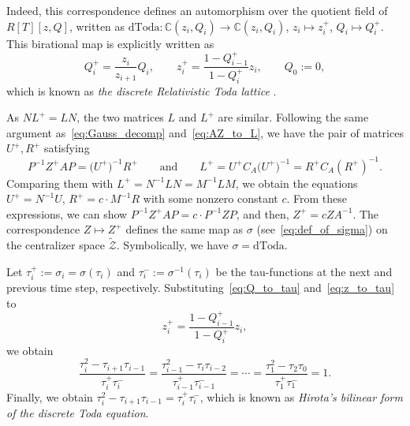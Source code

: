 \documentclass[10pt,a4paper]{amsart}
\numberwithin{equation}{section}
\def\CC{\mathord{\mathbb{C}}}
\theoremstyle{definition}
\begin{document}
Indeed, this correspondence defines an automorphism over the quotient field of~$R[T][z,Q]$, written as
$%
\mathrm{dToda}\colon \CC(z_i,Q_i)\to \CC(z_i,Q_i)$, $ z_i\mapsto z_i^+$, $ Q_i\mapsto Q_i^+$.
This birational map is explicitly written as
\[
Q^+_i=\frac{z_{i}}{z_{i+1}}Q_i, \qquad
z^+_i=\frac{1-Q^+_{i-1}}{1-Q^+_{i}}z_i
, \qquad Q_0:=0,
\]
which is known as \textit{the discrete Relativistic Toda lattice} \cite{Suris}.


As $NL^+=LN$, the two matrices $L$ and $L^+$ are similar.
Following the same argument as~\eqref{eq:Gauss_decomp} and~\eqref{eq:AZ_to_L}, we have the pair of matrices $U^+,R^+$ satisfying
\[
P^{-1}Z^+AP=\bigl(U^+\bigr)^{-1}R^+\qquad \mbox{and} \qquad L^+=U^+C_A\bigl(U^+\bigr)^{-1}=R^+C_A(R^+)^{-1}.
\]
Comparing them with $L^+=N^{-1}LN=M^{-1}LM$, we obtain the equations
$
U^{+}=N^{-1}U$, $ R^+=c \cdot M^{-1}R
$
with some nonzero constant $c$.
From these expressions, we can show $P^{-1}Z^+AP=c\cdot P^{-1}ZP$, and then,
$%
Z^+=cZA^{-1}$.
The correspondence $Z\mapsto Z^+$ defines the same map as $\sigma$ (see~\eqref{eq:def_of_sigma}) on the centralizer space $\tilde{\mathscr{Z}}$.
Symbolically, we have $\sigma=\mathrm{dToda}$.

Let
$\tau^+_i:=\sigma_i=\sigma(\tau_i)$
and $\tau^-_i:=\sigma^{-1}(\tau_i)$ be the tau-functions at the next and previous time step, respectively.
Substituting~\eqref{eq:Q_to_tau} and~\eqref{eq:z_to_tau} to
\[
z_i^+=\frac{1-Q^+_{i-1}}{1-Q^+_{i}}z_i,
\] we obtain
\[
\frac{\tau_i^2-\tau_{i+1}\tau_{i-1}}{\tau_i^+\tau_i^-}=
\frac{\tau_{i-1}^2-\tau_{i}\tau_{i-2}}{\tau_{i-1}^+\tau_{i-1}^-}=\cdots
=
\frac{\tau_{1}^2-\tau_{2}\tau_{0}}{\tau_{1}^+\tau_{1}^-}=1.
\]
Finally, we obtain
$%
\tau_i^2-\tau_{i+1}\tau_{i-1}=\tau_i^+\tau_i^-$,
which is known as \textit{Hirota's bilinear form of the discrete Toda equation}.
\end{document}
